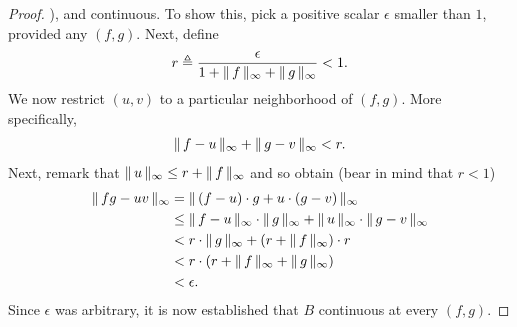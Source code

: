 \begin{proof}
), %
and continuous. To show this, pick a positive scalar %
$\epsilon $ smaller than $1$, provided any $(f, g)$. Next, define %
%
\begin{align}
  r \triangleq \frac{\epsilon}{1 + \norm{\infty}{f} + \norm{\infty}{g}} < 1. %
\end{align}
%
We now restrict $(u, v)$ to a particular neighborhood of $(f, g)$. %
More specifically,  
\begin{align}
  \norm{\infty}{f-u} + \norm{\infty}{g-v} < r. %
\end{align}
%
Next, remark that %
%
  $\| \,u \, \|_{\infty} \leq r + \| \,f \, \|_{\infty}$ %
%
and so obtain (bear in mind that $r < 1$)%
%
  \begin{align}
    \| \,fg - uv \, \|_{\infty} 
      & =
    \| \,(f-u) \cdot g + u \cdot (g-v) \, \|_{\infty} \\
      & \leq
    \| \,f-u \, \|_{\infty} \cdot \| \,g \, \|_{\infty} + 
    \| \,u \, \|_{\infty}   \cdot \| \,g-v \, \|_{\infty} \\
      & < r \cdot \| \,g \, \|_{\infty} + (r + \| \,f \, \|_{\infty}) \cdot r \\
      & < r \cdot (r + \| \,f \, \|_{\infty} + \| \,g \, \|_{\infty})  \\
      & < \epsilon.
  \end{align}
%
Since $\epsilon$ was arbitrary, it is now established that $B$ continuous %
at every $(f, g)$.
\end{proof}
